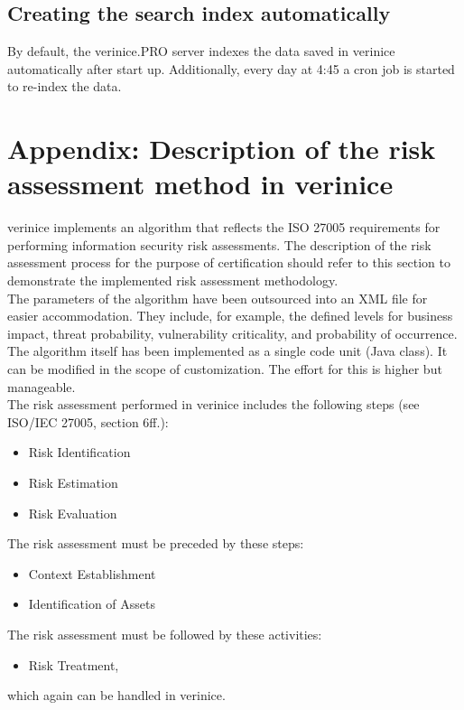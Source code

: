 \documentclass[a4paper,10pt]{book}
\begin{document}
\section{Creating the search index automatically}
\label{sec:creating-index-automatically}

By default, the verinice.PRO server indexes the data saved in verinice
automatically after start up. Additionally, every day at 4:45 a cron
job is started to re-index the data.

\chapter{Appendix: Description of the risk assessment method in verinice}
verinice implements an algorithm that reflects the ISO 27005 requirements for performing information security
risk assessments. The description of the risk assessment process for the purpose of certification should refer
to this section to demonstrate the implemented risk assessment methodology.
\newline\\
The parameters of the algorithm have been outsourced into an XML file for easier accommodation. They include,
for example, the defined levels for business impact, threat probability, vulnerability criticality, and probability
of occurrence.
\newline\\
The algorithm itself has been implemented as a single code unit (Java class). It can be modified in the scope of
customization. The effort for this is higher but manageable.
\newline\\
The risk assessment performed in verinice includes the following steps (see ISO/IEC 27005, section 6ff.):
\begin{itemize}
 \item Risk Identification
 \item Risk Estimation
 \item Risk Evaluation
\end{itemize}
The risk assessment must be preceded by these steps:
\begin{itemize}
 \item Context Establishment
 \item Identification of Assets
\end{itemize}
The risk assessment must be followed by these activities:
\begin{itemize}
 \item Risk Treatment,
\end{itemize}
which again can be handled in verinice.
\end{document}
